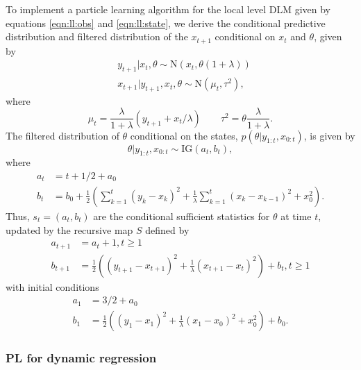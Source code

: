 To implement a particle learning algorithm for the local level DLM given by equations \eqref{eqn:ll:obs} and \eqref{eqn:ll:state}, we derive the conditional predictive distribution and filtered distribution of the $x_{t+1}$ conditional on $x_t$ and $\theta$, given by
\begin{align}
&y_{t+1}|x_t,\theta \sim \mbox{N}\left(x_t,\theta(1+\lambda)\right) \label{eqn:pl:ll:pred} \\
&x_{t+1}|y_{t+1},x_t,\theta \sim \mbox{N}(\mu_t,\tau^2) \label{eqn:pl:ll:state},
\end{align}
where \[\mu_t = \frac{\lambda}{1+\lambda}(y_{t+1} + x_t / \lambda) \qquad \tau^2 = \theta\frac{\lambda}{1+\lambda}.\]
The filtered distribution of $\theta$ conditional on the states, $p(\theta|y_{1:t},x_{0:t})$, is given by
\begin{equation}
\theta|y_{1:t},x_{0:t} \sim \mbox{IG}(a_t,b_t),
\end{equation}
where
\begin{align*}
a_t &= t + 1/2 + a_0 \\
b_t &= b_0 + \frac{1}{2}\left(\sum_{k=1}^t (y_k - x_k)^2 + \frac{1}{\lambda}\sum_{k=1}^t (x_k - x_{k-1})^2 + x_0^2\right).
\end{align*}
Thus, $s_t = (a_t,b_t)$ are the conditional sufficient statistics for $\theta$ at time $t$, updated by the recursive map $S$ defined by
\begin{align}
a_{t+1} &= a_t + 1, t \ge 1 \label{eqn:pl:ll:a} \\
b_{t+1} &= \frac{1}{2}\left((y_{t+1}-x_{t+1})^2 + \frac{1}{\lambda}(x_{t+1}-x_t)^2\right) + b_t, t \ge 1 \label{eqn:pl:ll:b}
\end{align}
with initial conditions
\begin{align*}
a_1 &= 3/2 + a_0 \\
b_1 &= \frac{1}{2}\left((y_1-x_1)^2 + \frac{1}{\lambda}(x_1-x_0)^2 + x_0^2\right) + b_0.
\end{align*}

\subsubsection{PL for dynamic regression}

